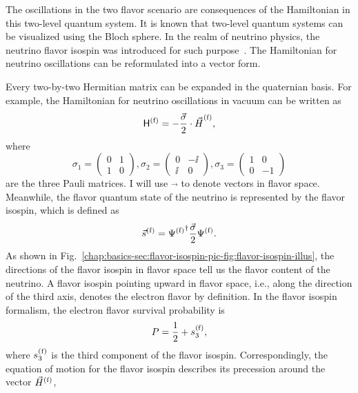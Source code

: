 The oscillations in the two flavor scenario are consequences of the Hamiltonian in this two-level quantum system. It is known that two-level quantum systems can be visualized using the Bloch sphere. In the realm of neutrino physics, the neutrino flavor isospin was introduced for such purpose~\cite{Duan2006b}. The Hamiltonian for neutrino oscillations can be reformulated into a vector form.

Every two-by-two Hermitian matrix can be expanded in the quaternian basis. For example, the Hamiltonian for neutrino oscillations in vacuum can be written as
\begin{equation}
\mathsf H^{(\mathrm f)} = - \frac{\vec{\sigma} }{2}\cdot {\vec{H}}^{(\mathrm f)},
\end{equation}
where
\begin{equation}
\sigma_1 =  \begin{pmatrix}
0 & 1 \\
1 & 0
\end{pmatrix}, \sigma_2 =  \begin{pmatrix}
0 & -\ii \\
\ii & 0
\end{pmatrix},  \sigma_3 =  \begin{pmatrix}
1 & 0 \\
0 & -1
\end{pmatrix}
\end{equation}
are the three Pauli matrices. I will use $\vec{}$ to denote vectors in flavor space.
Meanwhile, the flavor quantum state of the neutrino is represented by the flavor isospin, which is defined as
\begin{equation}
    \vec s^{(\mathrm f)} = {\Psi^{(\mathrm f)}}^{\dagger} \frac{\vec{\sigma} }{2} \Psi^{(\mathrm f)}.
\end{equation}
As shown in Fig.~\ref{chap:basics-sec:flavor-isospin-pic-fig:flavor-isospin-illus}, the directions of the flavor isospin in flavor space tell us the flavor content of the neutrino. A flavor isospin pointing upward in flavor space, i.e., along the direction of the third axis, denotes the electron flavor by definition. In the flavor isospin formalism, the electron flavor survival probability is
\begin{equation*}
P = \frac{1}{2} + s^{{(\ff)}}_3,
\label{chap:basics-sec:flavor-isospin-pic-eqn:probability-flavor}
\end{equation*}
where $s^{(\mathrm f)}_3$ is the third component of the flavor isospin.
Correspondingly, the equation of motion for the flavor isospin describes its precession around the vector $\vec{H}^{(\mathrm f)}$,
